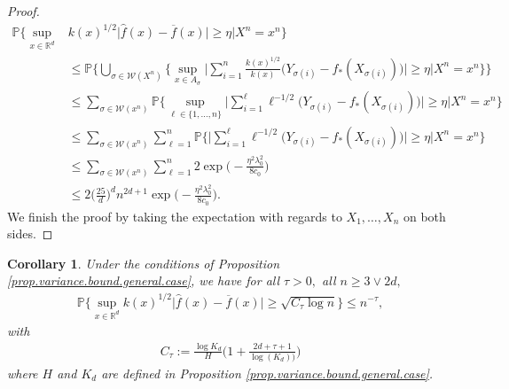 \documentclass[10pt]{article}
\newcommand{\mW}{\mathcal{W}}
\newcommand{\PP}{\mathbb{P}}
\newcommand{\RR}{\mathbb{R}}
\newcommand{\wh}{\widehat}
\newcommand{\ol}{\overline}
\newtheorem{corollary}[theorem]{Corollary}
\begin{document}
\begin{proof}
\begin{align*}
    \PP\Bigg\{\sup_{x \in \RR^d}&k(x)^{1/2}\big|\wh f(x) - \ol f(x)\big| \geq \eta\Big| X^n = x^n\Bigg\} \\
    &\leq \PP\Bigg\{\bigcup_{\sigma \in \mW(X^n)}\Bigg\{\sup_{x \in A_\sigma}\Big|\sum_{i=1}^n \frac{k(x)^{1/2}}{k(x)}\big(Y_{\sigma(i)} - f_*(X_{\sigma(i)})\big)\Big| \geq \eta \bigg| X^n = x^n\Bigg\}\Bigg\}\\
    &\leq \sum_{\sigma \in \mW(x^n)}\PP\Bigg\{\sup_{\ell \in \{1, \dots, n\}}\Big|\sum_{i=1}^\ell \ell^{-1/2}\big(Y_{\sigma(i)} - f_*(X_{\sigma(i)})\big)\Big| \geq \eta \bigg| X^n = x^n\Bigg\}\\
    &\leq \sum_{\sigma \in \mW(x^n)}\sum_{\ell = 1}^n\PP\Bigg\{\Big|\sum_{i=1}^\ell \ell^{-1/2}\big(Y_{\sigma(i)} - f_*(X_{\sigma(i)})\big)\Big| \geq \eta \bigg| X^n = x^n\Bigg\}\\
    &\leq \sum_{\sigma \in \mW(x^n)}\sum_{\ell = 1}^n 2\exp\bigg(-\frac{\eta^2\lambda_0^2}{8c_0}\bigg)\\
    &\leq 2\Big(\frac{25}d\Big)^dn^{2d+1} \exp\bigg(-\frac{\eta^2\lambda_0^2}{8c_0}\bigg).
\end{align*}
We finish the proof by taking the expectation with regards to $X_1, \dots, X_n$ on both sides.
\end{proof}

\begin{corollary}
    \label{cor.variance.bound.nice.version}
    Under the conditions of Proposition \ref{prop.variance.bound.general.case}, we have for all $\tau > 0,$ all $n \geq 3 \vee 2d,$
    \begin{align*}
        \PP\Bigg\{\sup_{x \in \RR^d}k(x)^{1/2}\big|\wh f(x) - \ol f(x)\big|\geq \sqrt{C_\tau \log n}\Bigg\} \leq n^{-\tau},
    \end{align*}
    with 
    \begin{align*}
        C_\tau := \frac{\log K_d}{H}\bigg(1 + \frac{2d + \tau + 1 }{\log(K_d))}\bigg)
    \end{align*} where $H$ and $K_d$ are defined in Proposition \ref{prop.variance.bound.general.case}.
\end{corollary}
\end{document}
